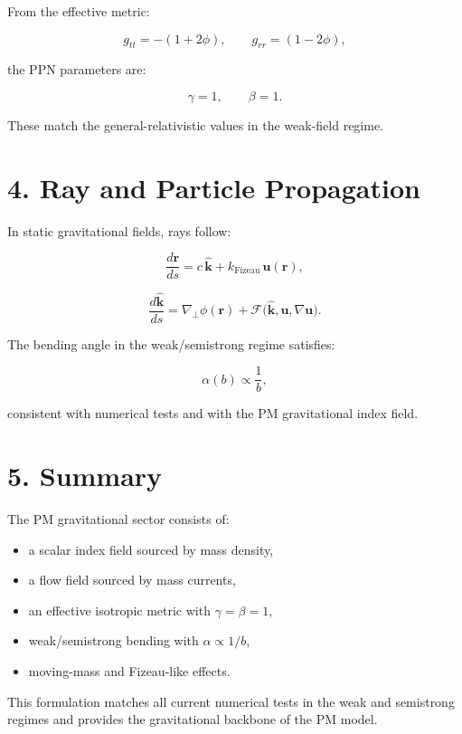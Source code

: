 \documentclass{article}
\begin{document}
From the effective metric:



\[
g_{tt} = -(1 + 2\phi),
\qquad
g_{rr} = (1 - 2\phi),
\]



the PPN parameters are:



\[
\gamma = 1,
\qquad
\beta = 1.
\]



These match the general-relativistic values in the weak-field regime.

\section*{4. Ray and Particle Propagation}

In static gravitational fields, rays follow:



\[
\frac{d\mathbf r}{ds}
= c\,\hat{\mathbf k}
+ k_{\mathrm{Fizeau}}\,\mathbf u(\mathbf r),
\]





\[
\frac{d\hat{\mathbf k}}{ds}
= \nabla_\perp \phi(\mathbf r)
+ \mathcal{F}\big(\hat{\mathbf k}, \mathbf u, \nabla \mathbf u\big).
\]



The bending angle in the weak/semistrong regime satisfies:



\[
\alpha(b) \propto \frac{1}{b},
\]



consistent with numerical tests and with the PM gravitational index field.

\section*{5. Summary}

The PM gravitational sector consists of:

\begin{itemize}
    \item a scalar index field sourced by mass density,
    \item a flow field sourced by mass currents,
    \item an effective isotropic metric with $\gamma = \beta = 1$,
    \item weak/semistrong bending with $\alpha \propto 1/b$,
    \item moving-mass and Fizeau-like effects.
\end{itemize}

This formulation matches all current numerical tests in the weak and
semistrong regimes and provides the gravitational backbone of the PM model.
\end{document}
